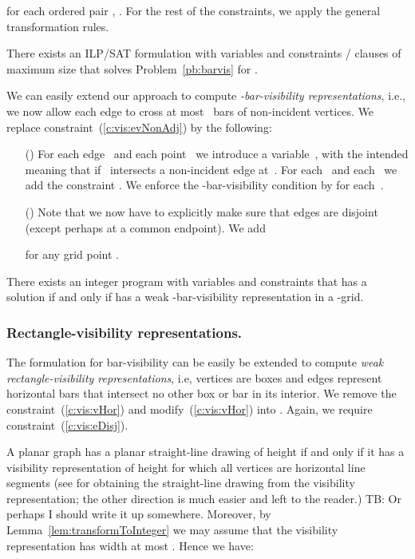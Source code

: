 \documentclass[runningheads]{llncs}
\newcommand{\comment}[1]{{\color{red} #1}}
\newcounter{constr}
\newcommand{\constr}[1]{\noindent \refstepcounter{constr}\theconstr #1}
\begin{document}
for each ordered pair , .
For the rest of the constraints, we apply the general transformation
rules.

\begin{theorem}\label{thm:barkvis}
	There exists an ILP/SAT formulation with  variables and
 constraints /  clauses
of maximum size  that solves Problem~\ref{pb:barvis} for .
\end{theorem}



\iffalse


We can easily extend our approach to compute 
\emph{-bar-visibility representations}\cite{???},
i.e., we now allow each edge to cross at most~ bars of 
non-incident vertices.
We replace constraint~(\ref{c:vis:evNonAdj}) by the following:
\begin{itemize}
  \item[(\constr{\label{c:vis:kbar}})]
  For each edge~ and each point~ we introduce 
  a variable~, with the intended meaning that
   if~ intersects a non-incident edge at~.
  For each~ and each~ we add the constraint
  .
  We enforce the -bar-visibility condition by 
  for each~.
  \item[(\constr{\label{c:vis:eDisj}})]
  Note that we now have to explicitly make sure that edges are disjoint (except perhaps at a common
  endpoint). We add
  
  for any grid point .  
\end{itemize}
\begin{lemma}
There exists an integer program with  variables and
constraints that has a solution if and only if   has a
weak -bar-visibility representation in a -grid.
\end{lemma}
\subsubsection{Rectangle-visibility representations.}
The formulation for bar-visibility can be easily be extended to compute 
\emph{weak rectangle-visibility representations}\cite{???},
i.e, vertices are boxes and edges represent horizontal bars
that intersect no other box or bar in its interior.
We remove the constraint~(\ref{c:vis:vHor})
and modify~(\ref{c:vis:vHor})
into .
Again, we require constraint~(\ref{c:vis:eDisj}).
\par
A planar graph has a planar straight-line drawing of
height  if and only if it has a visibility representation
of height  for which all vertices are horizontal line 
segments (see \cite{Bie-WAOA12} for obtaining the straight-line
drawing from the visibility representation; the other direction
is much easier and left to the reader.)
\comment{TB: Or perhaps I should write it up somewhere.}
Moreover, by Lemma~\ref{lem:transformToInteger} we may
assume that the visibility representation has width at most .
Hence we have:
\end{document}
